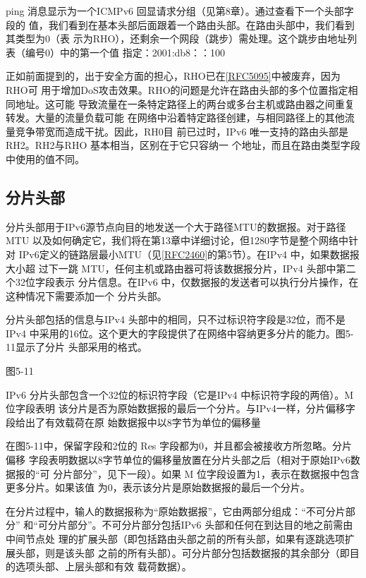 ping 消息显示为一个ICMPv6 回显请求分组（见第8章）。通过查看下一个头部字段的
值，我们看到在基本头部后面跟着一个路由头部。在路由头部中，我们看到其类型为0（表
示为RHO），还剩余一个网段（跳步）需处理。这个跳步由地址列表（编号0）中的第一个值
指定：2001:db8：：100

正如前面提到的，出于安全方面的担心，RHO已在\href{https://www.rfc-editor.org/rfc/rfc5095}{[RFC5095]}中被废弃，因为RHO可
用于增加DoS攻击效果。RHO的问题是允许在路由头部的多个位置指定相同地址。这可能
导致流量在一条特定路径上的两台或多台主机或路由器之间重复转发。大量的流量负载可能
在网络中沿着特定路径创建，与相同路径上的其他流量竞争带宽而造成干扰。因此，RH0目
前已过时，IPv6 唯一支持的路由头部是RH2。RH2与RHO 基本相当，区别在于它只容纳一
个地址，而且在路由类型字段中使用的值不同。

\subsection{分片头部}
分片头部用于IPv6源节点向目的地发送一个大于路径MTU的数据报。对于路径
MTU 以及如何确定它，我们将在第13章中详细讨论，但1280字节是整个网络中针对
IPv6定义的链路层最小MTU（见\href{https://www.rfc-editor.org/rfc/rfc2460}{[RFC2460]}的第5节）。在IPv4 中，如果数据报大小超
过下一跳 MTU，任何主机或路由器可将该数据报分片，IPv4 头部中第二个32位字段表示
分片信息。在IPv6 中，仅数据报的发送者可以执行分片操作，在这种情况下需要添加一个
分片头部。

分片头部包括的信息与IPv4 头部中的相同，只不过标识符字段是32位，而不是IPv4
中采用的16位。这个更大的字段提供了在网络中容纳更多分片的能力。图5-11显示了分片
头部采用的格式。

图5-11

IPv6 分片头部包含一个32位的标识符字段（它是IPv4 中标识符字段的两倍）。M位字段表明
该分片是否为原始数据报的最后一个分片。与IPv4一样，分片偏移字段给出了有效载荷在原
始数据报中以8字节为单位的偏移量

在图5-11中，保留字段和2位的 Res 字段都为0，并且都会被接收方所忽略。分片偏移
字段表明数据以8字节单位的偏移量放置在分片头部之后（相对于原始IPv6数据报的“可
分片部分”，见下一段）。如果 M 位字段设置为1，表示在数据报中包含更多分片。如果该值
为0，表示该分片是原始数据报的最后一个分片。

在分片过程中，输人的数据报称为“原始数据报”，它由两部分组成：“不可分片部分”
和“可分片部分”。不可分片部分包括IPv6 头部和任何在到达目的地之前需由中间节点处
理的扩展头部（即包括路由头部之前的所有头部，如果有逐跳选项扩展头部，则是该头部
之前的所有头部）。可分片部分包括数据报的其余部分（即目的选项头部、上层头部和有效
载荷数据）。

